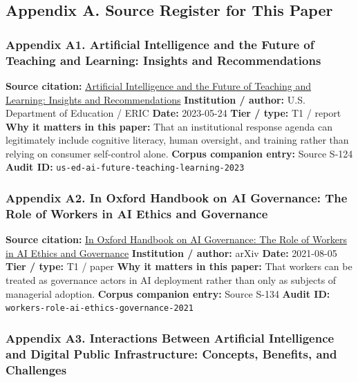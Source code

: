\documentclass[
  american,
  11pt,
  letterpaper,
]{article}
\begin{document}
\subsection{Appendix A. Source Register for This
Paper}\label{appendix-a.-source-register-for-this-paper}

\subsubsection{Appendix A1. Artificial Intelligence and the Future of
Teaching and Learning: Insights and
Recommendations}\label{appendix-a1-artificial-intelligence-and-the-future-of-teaching-and-learning-insights-and-recommendations}

\textbf{Source citation:}
\href{https://eric.ed.gov/?id=ED631097}{Artificial Intelligence and the
Future of Teaching and Learning: Insights and Recommendations}
\textbf{Institution / author:} U.S. Department of Education / ERIC
\textbf{Date:} 2023-05-24 \textbf{Tier / type:} T1 / report \textbf{Why
it matters in this paper:} That an institutional response agenda can
legitimately include cognitive literacy, human oversight, and training
rather than relying on consumer self-control alone. \textbf{Corpus
companion entry:} Source S-124 \textbf{Audit ID:}
\texttt{us-ed-ai-future-teaching-learning-2023}

\subsubsection{Appendix A2. In Oxford Handbook on AI Governance: The
Role of Workers in AI Ethics and
Governance}\label{appendix-a2-in-oxford-handbook-on-ai-governance-the-role-of-workers-in-ai-ethics-and-governance}

\textbf{Source citation:} \href{https://arxiv.org/abs/2108.07700}{In
Oxford Handbook on AI Governance: The Role of Workers in AI Ethics and
Governance} \textbf{Institution / author:} arXiv \textbf{Date:}
2021-08-05 \textbf{Tier / type:} T1 / paper \textbf{Why it matters in
this paper:} That workers can be treated as governance actors in AI
deployment rather than only as subjects of managerial adoption.
\textbf{Corpus companion entry:} Source S-134 \textbf{Audit ID:}
\texttt{workers-role-ai-ethics-governance-2021}

\subsubsection{Appendix A3. Interactions Between Artificial Intelligence
and Digital Public Infrastructure: Concepts, Benefits, and
Challenges}\label{appendix-a3-interactions-between-artificial-intelligence-and-digital-public-infrastructure-concepts-benefits-and-challenges}
\end{document}
